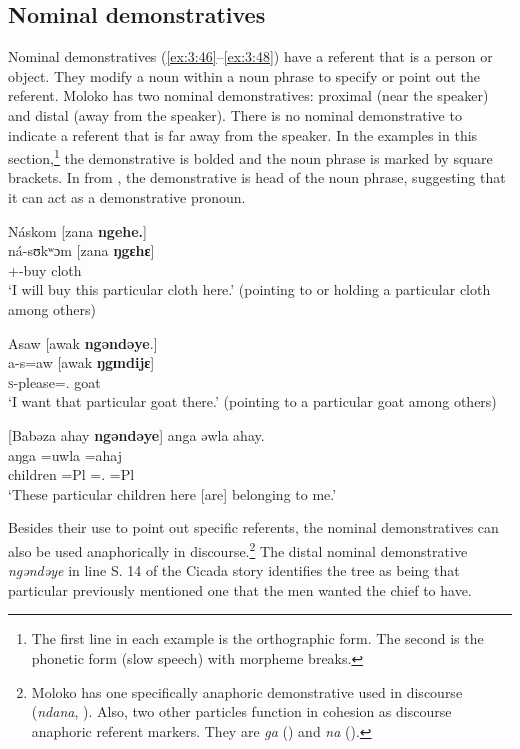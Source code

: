 \subsection{Nominal demonstratives}\label{sec:3.2.1}
\hypertarget{RefHeading1210961525720847}{}
Nominal demonstratives (\ref{ex:3:46}--\ref{ex:3:48}) have a referent that is a person or object. They modify a noun within a noun phrase to specify or point out the referent. Moloko has two nominal demonstratives: proximal (near the speaker) and distal (away from the speaker). There is no nominal demonstrative to indicate a referent that is far away from the speaker. In the examples in this section,\footnote{The first line in each example is the orthographic form. The second is the phonetic form (slow speech) with morpheme breaks.} the demonstrative is bolded and the noun phrase is marked by square brackets. In  from , the demonstrative is head of the noun phrase, suggesting that it can act as a demonstrative pronoun. 

\ea \label{ex:3:46}
Náskom  [zana \textbf{ngehe.}]\\
\gll  ná-sʊkʷɔm  [zana  \textbf{ŋgɛhɛ}]\\
      {\oneS}+{\IFV}-buy  cloth  {\DEM}\\
\glt  ‘I will buy this particular cloth here.’ (pointing to or holding a particular cloth among others)
\z

\ea \label{ex:3:47}
Asaw  [awak \textbf{ngəndəye}.]\\
\gll  a-s=aw    [awak  \textbf{ŋgɪndijɛ}]\\
      \textsc{s}-please={\oneS}.{\IO}  goat  {\DEM}\\
\glt  ‘I want that particular goat there.’ (pointing to a particular goat among others)
\z

\ea \label{ex:3:48}
[Babəza  ahay  \textbf{ngəndəye}]  anga  əwla  ahay.\\
\gll  [babəza  =ahaj   \textbf{ŋgɪndijɛ}]  aŋga  =uwla     =ahaj\\
      children  =Pl  {\DEM}     {\POSS}  ={\oneS}.{\POSS}  =Pl  \\
\glt  ‘These particular children here [are] belonging to me.’ 
\z

Besides their use to point out specific referents, the nominal demonstratives can also be used anaphorically in discourse.\footnote{Moloko has one specifically anaphoric demonstrative used in discourse (\textit{ndana}, ). Also, two other particles function in cohesion as discourse anaphoric referent markers. They are \textit{ga} () and \textit{na} ().} The distal nominal demonstrative \textit{ngəndəye} in line S. 14 of the Cicada story  identifies the tree as being that particular previously mentioned one that the men wanted the chief to have. 

